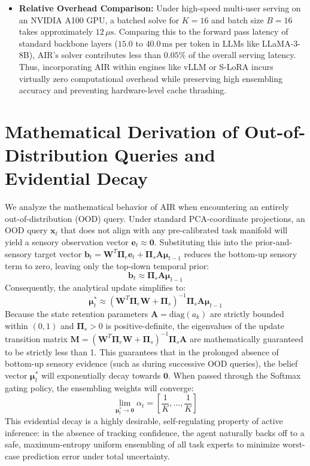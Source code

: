 \documentclass{article}
\theoremstyle{plain}
\theoremstyle{definition}
\theoremstyle{remark}
\begin{document}
\begin{itemize}
    \item \textbf{Relative Overhead Comparison:} Under high-speed multi-user serving on an NVIDIA A100 GPU, a batched solve for $K=16$ and batch size $B=16$ takes approximately $12\,\mu\text{s}$. Comparing this to the forward pass latency of standard backbone layers ($15.0$ to $40.0\,\text{ms}$ per token in LLMs like LLaMA-3-8B), AIR's solver contributes less than $0.05\%$ of the overall serving latency. Thus, incorporating AIR within engines like vLLM or S-LoRA incurs virtually zero computational overhead while preserving high ensembling accuracy and preventing hardware-level cache thrashing.
\end{itemize}


\section{Mathematical Derivation of Out-of-Distribution Queries and Evidential Decay}
\label{app:ood_decay}

We analyze the mathematical behavior of AIR when encountering an entirely out-of-distribution (OOD) query. Under standard PCA-coordinate projections, an OOD query $\mathbf{x}_t$ that does not align with any pre-calibrated task manifold will yield a sensory observation vector $\mathbf{e}_t \approx \mathbf{0}$. Substituting this into the prior-and-sensory target vector $\mathbf{b}_t = \mathbf{W}^T \mathbf{\Pi}_e \mathbf{e}_t + \mathbf{\Pi}_s \mathbf{A}\mathbf{\mu}_{t-1}$ reduces the bottom-up sensory term to zero, leaving only the top-down temporal prior:
\begin{equation}
\mathbf{b}_t \approx \mathbf{\Pi}_s \mathbf{A}\mathbf{\mu}_{t-1}
\end{equation}
Consequently, the analytical update simplifies to:
\begin{equation}
\mathbf{\mu}_t^* \approx \left(\mathbf{W}^T \mathbf{\Pi}_e \mathbf{W} + \mathbf{\Pi}_s\right)^{-1} \mathbf{\Pi}_s \mathbf{A}\mathbf{\mu}_{t-1}
\end{equation}
Because the state retention parameters $\mathbf{A} = \text{diag}(a_k)$ are strictly bounded within $(0, 1)$ and $\mathbf{\Pi}_s > 0$ is positive-definite, the eigenvalues of the update transition matrix $\mathbf{M} = \left(\mathbf{W}^T \mathbf{\Pi}_e \mathbf{W} + \mathbf{\Pi}_s\right)^{-1} \mathbf{\Pi}_s \mathbf{A}$ are mathematically guaranteed to be strictly less than 1. This guarantees that in the prolonged absence of bottom-up sensory evidence (such as during successive OOD queries), the belief vector $\mathbf{\mu}_t^*$ will exponentially decay towards $\mathbf{0}$. When passed through the Softmax gating policy, the ensembling weights will converge:
\begin{equation}
\lim_{\mathbf{\mu}_t^* \to \mathbf{0}} \alpha_{t} = \left[ \frac{1}{K}, \dots, \frac{1}{K} \right]
\end{equation}
This evidential decay is a highly desirable, self-regulating property of active inference: in the absence of tracking confidence, the agent naturally backs off to a safe, maximum-entropy uniform ensembling of all task experts to minimize worst-case prediction error under total uncertainty.
\end{document}
